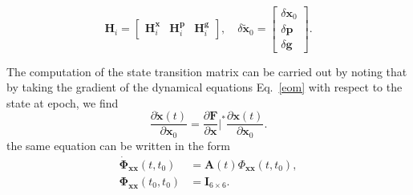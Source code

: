 \documentclass[lineno, pdflatex,sn-mathphys-ay]{sn-jnl}
\theoremstyle{thmstyleone}%
\theoremstyle{thmstyletwo}%
\theoremstyle{thmstylethree}%
\renewcommand{\vec}[1]{\boldsymbol{#1}}
\begin{document}
	\begin{equation}
		\label{eq:def:HMat}
		\vec{H}_{i} = 
		\begin{bmatrix}
			\vec{H}_{i}^{\vec{x}}  & 	\vec{H}_{i}^{\vec{p}} & \vec{H}^{\vec{g}}_i 
		\end{bmatrix}, \quad 
		\delta\tilde{	\vec{x}}_0 =
		\begin{bmatrix}
			\delta\vec{x}_0 \\ \delta\vec{p} \\ \delta\vec{g} 
		\end{bmatrix}.
	\end{equation}
	
	
	
	The computation of the state transition matrix can be carried out by noting that by taking the gradient of the dynamical equations Eq.~\eqref{eom} with respect to the state at epoch, we find
	\begin{equation}
		\frac{\partial \dot{\vec{x}}(t)}{\partial \vec{x}_0} = \frac{\partial \vec{F}}{\partial \vec{x}} \Bigg|^* \frac{\partial \vec{x}(t)}{\partial \vec{x}_0}.
		 \label{eq:22.28}
	\end{equation}
	the same equation can be written in the form
	\begin{subequations}
	\begin{align}
		\dot{\vec{\Phi}}_{\vec{xx}}(t, t_0) &= \vec{A}(t) \Phi_{\vec{xx}}(t, t_0), 
		\\ 
		\vec{\Phi}_{\vec{xx}}(t_0, t_0) &= \vec{I}_{6\times 6}.
		\label{eq:22.32}
	\end{align}
	\end{subequations}
	
\end{document}
